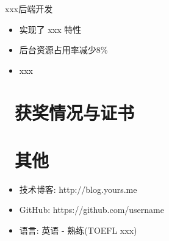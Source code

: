 \documentclass{resume}
\begin{document}
xxx后端开发
\begin{itemize}
  \item 实现了 xxx 特性
  \item 后台资源占用率减少8\%
  \item xxx
\end{itemize}


\section{\faHeartO\ 获奖情况与证书}

\section{\faInfo\ 其他}
\begin{itemize}[parsep=0.5ex]
  \item 技术博客: http://blog.yours.me
  \item GitHub: https://github.com/username
  \item 语言: 英语 - 熟练(TOEFL xxx)
\end{itemize}

%
%
\end{document}
